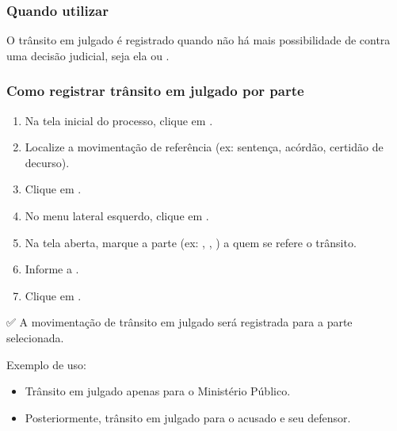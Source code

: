 \documentclass[letterpaper,10pt,brazil]{sphinxmanual}
\begin{document}
\subsubsection{Quando utilizar}
\label{\detokenize{projud_40_transitaremjulgado:quando-utilizar}}
\sphinxAtStartPar
O trânsito em julgado é registrado quando não há mais possibilidade de  contra uma decisão judicial, seja ela  ou .


\subsubsection{Como registrar trânsito em julgado por parte}
\label{\detokenize{projud_40_transitaremjulgado:como-registrar-transito-em-julgado-por-parte}}\begin{enumerate}
%
\item {} 
\sphinxAtStartPar
Na tela inicial do processo, clique em .

\item {} 
\sphinxAtStartPar
Localize a movimentação de referência (ex: sentença, acórdão, certidão de decurso).

\item {} 
\sphinxAtStartPar
Clique em .

\item {} 
\sphinxAtStartPar
No menu lateral esquerdo, clique em .

\item {} 
\sphinxAtStartPar
Na tela aberta, marque a parte (ex: , , ) a quem se refere o trânsito.

\item {} 
\sphinxAtStartPar
Informe a .

\item {} 
\sphinxAtStartPar
Clique em .

\end{enumerate}

\sphinxAtStartPar
✅ A movimentação de trânsito em julgado será registrada para a parte selecionada.

\sphinxAtStartPar
Exemplo de uso:
\begin{itemize}
\item {} 
\sphinxAtStartPar
Trânsito em julgado apenas para o Ministério Público.

\item {} 
\sphinxAtStartPar
Posteriormente, trânsito em julgado para o acusado e seu defensor.

\end{itemize}
\end{document}
